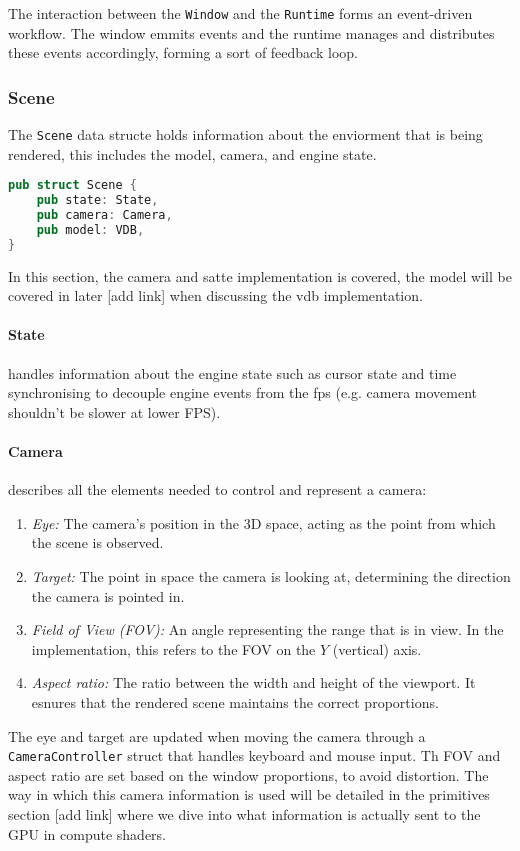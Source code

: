 The interaction between the \verb|Window| and the \verb|Runtime| forms an event-driven workflow. The window emmits events and the runtime manages and distributes these events accordingly, forming a sort of feedback loop.

\subsubsection{Scene}\label{scene:def}
The \verb|Scene| data structe holds information about the enviorment that is being rendered, this includes the model, camera, and engine state.

\begin{lstlisting}[language=rust,caption={Scene definition},captionpos=b]
pub struct Scene {
    pub state: State,
    pub camera: Camera,
    pub model: VDB,
}
\end{lstlisting}

In this section, the camera and satte implementation is covered, the model will be covered in later [add link] when discussing the \acrshort{vdb} implementation.

\paragraph{State} handles information about the engine state such as cursor state and time synchronising to decouple engine events from the \acrshort{fps} (e.g. camera movement shouldn't be slower at lower FPS).

\paragraph{Camera} describes all the elements needed to control and represent a camera:
\begin{enumerate}
    \item \emph{Eye:} The camera's position in the 3D space, acting as the point from which the scene is observed.
    \item \emph{Target:} The point in space the camera is looking at, determining the direction the camera is pointed in.
    \item \emph{Field of View (FOV):} An angle representing the range that is in view. In the implementation, this refers to the FOV on the $Y$ (vertical) axis.\label{fov:def}
    \item \emph{Aspect ratio:} The ratio between the width and height of the viewport. It esnures that the rendered scene maintains the correct proportions.
\end{enumerate}
The eye and target are updated when moving the camera through a \verb|CameraController| struct that handles keyboard and mouse input. Th FOV and aspect ratio are set based on the window proportions, to avoid distortion. The way in which this camera information is used will be detailed in the primitives section [add link] where we dive into what information is actually sent to the GPU in compute shaders.


